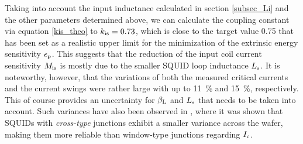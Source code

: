Taking into account the input inductance calculated in section \ref{subsec_Li} and the other parameters determined above, we can calculate the coupling constant via equation \ref{kis_theo} to $k_{\rm is}=0.73$, which is close to the target value 0.75 that has been set as a realistic upper limit for the minimization of the extrinsic energy sensitivity $\epsilon_{\rm p}$. This suggests that the reduction of the input coil current sensitivity $M_{\rm is}$ is mostly due to the smaller SQUID loop inductance $L_{\rm s}$. It is noteworthy, however, that the variations of both the measured critical currents and the current swings were rather large with up to \qty{11}{\percent} and \qty{15}{\percent}, respectively. This of course provides an uncertainty for $\beta_{\rm L}$ and $L_{\rm s}$ that needs to be taken into account. Such variances have also been observed in \cite{Bauer2022}, where it was shown that SQUIDs with \textit{cross-type} junctions exhibit a smaller variance across the wafer, making them more reliable than window-type junctions regarding $I_{\rm c}$. 






